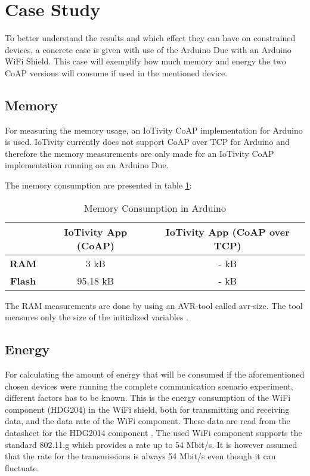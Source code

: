 \section{Case Study} \label{sec:casestudy}
To better understand the results and which effect they can have on constrained devices, a concrete case is given with use of the Arduino Due with an Arduino WiFi Shield. This case will exemplify how much memory and energy the two CoAP versions will consume if used in the mentioned device.

\subsection{Memory}
For measuring the memory usage, an IoTivity CoAP implementation for Arduino is used. IoTivity currently does not support CoAP over TCP for Arduino and therefore the memory measurements are only made for an IoTivity CoAP implementation running on an Arduino Due.
 
The memory consumption are presented in table \ref{tab:memory}:
\begin{table}[bht]
	\renewcommand{\arraystretch}{1.3}
	\caption{Memory Consumption in Arduino}
	\label{tab:memory}
	\centering
	\begin{tabular}{|c|c|c|}
		\hline
		\bfseries  & \bfseries IoTivity App (CoAP) & \bfseries IoTivity App (CoAP over TCP) \\
		\hline
		\textbf{RAM} & 3 kB & - kB \\
		\hline
		\textbf{Flash} & 95.18 kB & - kB \\
		\hline
	\end{tabular}
\end{table}

The RAM measurements are done by using an AVR-tool called avr-size. The tool measures only the size of the initialized variables \cite{Check55:online}.

\subsection{Energy}
For calculating the amount of energy that will be consumed if the aforementioned chosen devices were running the complete communication scenario experiment, different factors has to be known. This is the energy consumption of the WiFi component (HDG204) in the WiFi shield, both for transmitting and receiving data, and the data rate of the WiFi component. These data are read from the datasheet for the HDG2014 component \cite{hdg204:datasheet}. The used WiFi component supports the standard 802.11.g which provides a rate up to 54 Mbit/s. It is however assumed that the rate for the transmissions is always 54 Mbit/s even though it can fluctuate. 

